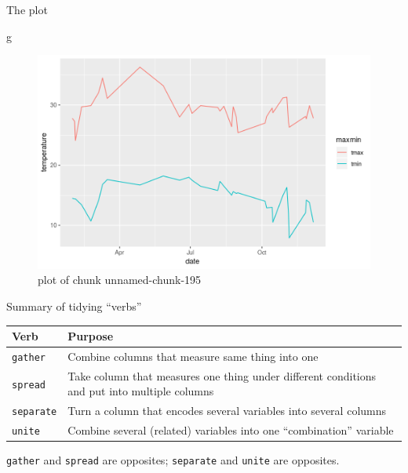 \documentclass[ignorenonframetext,]{beamer}
\newenvironment{Shaded}{\begin{snugshade}}{\end{snugshade}}
\newcommand{\NormalTok}[1]{#1}
\begin{document}
\begin{frame}[fragile]{The plot}
\protect\hypertarget{the-plot}{}

\begin{Shaded}
\begin{Highlighting}[]
\NormalTok{g}
\end{Highlighting}
\end{Shaded}

\begin{figure}
\centering
\includegraphics{figure/unnamed-chunk-195-1.png}
\caption{plot of chunk unnamed-chunk-195}
\end{figure}

\end{frame}

\begin{frame}{Summary of tidying ``verbs''}
\protect\hypertarget{summary-of-tidying-verbs}{}

\begin{tabular}{lp{}}
    Verb & Purpose\\
    \hline
    \texttt{gather}& Combine columns that measure same thing into one\\
    \texttt{spread}& Take column that measures one thing under
                     different conditions and put into multiple columns\\
    \texttt{separate} & Turn a column that encodes
                        several variables into
                        several columns\\
    \texttt{unite} & Combine several (related) variables into one
                     ``combination'' variable\\
    \hline
  \end{tabular}

\texttt{gather} and \texttt{spread} are opposites; \texttt{separate} and
\texttt{unite} are opposites.

\end{frame}
\end{document}
